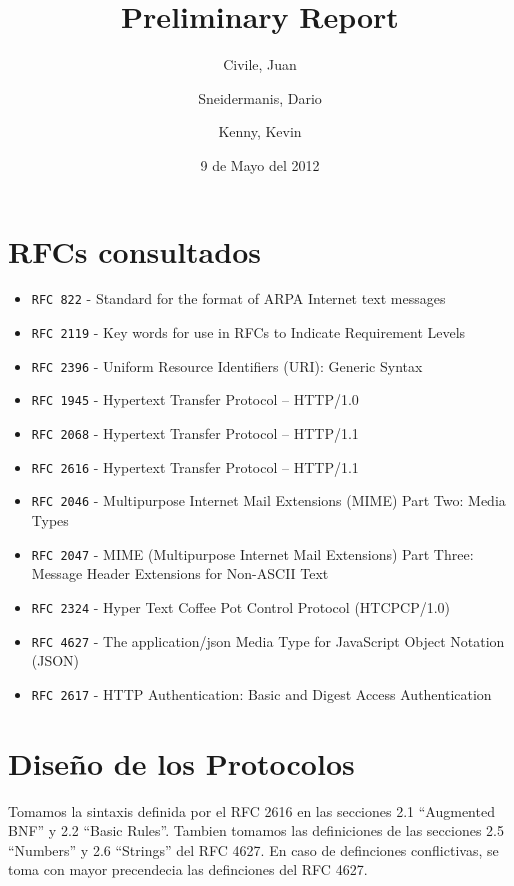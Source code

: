 \documentclass[11pt,a4paper,titlepage]{article}
\title{Preliminary Report}
\author{Civile, Juan \and Sneidermanis, Dario \and Kenny, Kevin}
\date{9 de Mayo del 2012}
\begin{document}
\newcommand{\awesome}[1]{\texttt{\large #1}}
\newcommand{\ua}{\textit{User Agent} }
\newcommand{\os}{\textit{Origin Server} }
\newcommand{\duta}{\awesome{dUta}}

\maketitle
\tableofcontents
\clearpage

\section{RFCs consultados}

\begin{itemize}

    \item \awesome{RFC 822}  - Standard for the format of ARPA Internet text messages
    \item \awesome{RFC 2119} - Key words for use in RFCs to Indicate Requirement Levels
    \item \awesome{RFC 2396} - Uniform Resource Identifiers (URI): Generic Syntax
    \item \awesome{RFC 1945} - Hypertext Transfer Protocol -- HTTP/1.0
    \item \awesome{RFC 2068} - Hypertext Transfer Protocol -- HTTP/1.1
    \item \awesome{RFC 2616} - Hypertext Transfer Protocol -- HTTP/1.1
    \item \awesome{RFC 2046} - Multipurpose Internet Mail Extensions (MIME) Part Two: Media Types
    \item \awesome{RFC 2047} - MIME (Multipurpose Internet Mail Extensions) Part Three: Message Header Extensions for Non-ASCII Text
    \item \awesome{RFC 2324} - Hyper Text Coffee Pot Control Protocol (HTCPCP/1.0)
    \item \awesome{RFC 4627} - The application/json Media Type for JavaScript Object Notation (JSON)
    \item \awesome{RFC 2617} - HTTP Authentication: Basic and Digest Access Authentication

\end{itemize}

\section{Diseño de los Protocolos}
Tomamos la sintaxis definida por el RFC 2616 en las secciones 2.1 ``Augmented BNF'' y 2.2 ``Basic Rules''.
Tambien tomamos las definiciones de las secciones 2.5 ``Numbers'' y 2.6 ``Strings'' del RFC 4627.
En caso de definciones conflictivas, se toma con mayor precendecia las definciones del RFC 4627.
\end{document}
